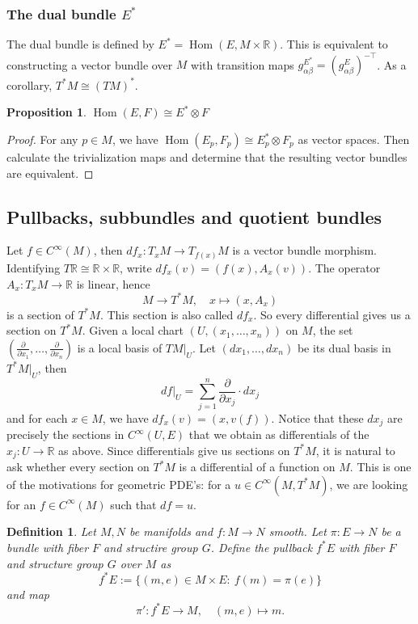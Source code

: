 \documentclass[10pt, a4paper]{article}
\newtheorem{proposition}[thm]{Proposition}
\newtheorem{defi}[thm]{Definition}
\newenvironment{noticeB}{%
  \tcolorbox[%
  notitle,
  empty,
  enhanced,  %
  breakable,
  coltext=black,
  colback=white, 
  fontupper=\rmfamily,
  noparskip,
  sharp corners,
  boxrule=-1pt,  %
  frame hidden,
  left=7pt,  %
  right=7pt,
  top=5pt,
  bottom=5pt,
  before skip=2.5ex plus 2pt,
  after skip=2.5ex plus 2pt,
  borderline west = {1.5pt}{-0.1pt}{blue!30!black}, %
  overlay unbroken and last={%
    \draw[color=black, line width=1.25pt]
    ($(frame.south west)+(1.pt, -0.1pt)$) -- ++(2em, 0);
  }
  ]}
{\endtcolorbox}
\newenvironment{definition}{\begin{noticeB}\begin{defi}}{%
    \end{defi}\end{noticeB}}
\newenvironment{noticeC}{%
  \tcolorbox[%
  notitle,
  empty,
  enhanced,  %
  breakable,
  coltext=black, 
  fontupper=\rmfamily,
  noparskip,
  sharp corners,
  boxrule=-1pt,  %
  frame hidden,
  left=7pt,  %
  right=7pt,
  top=5pt,
  bottom=5pt,
  before skip=2.5ex plus 2pt,
  after skip=2.5ex plus 2pt,
  overlay unbroken and last={%
  },
  ]}
{\endtcolorbox}
\newenvironment{myproof}%
  {\begin{noticeC}\begin{proof}}%
  {\end{proof}\end{noticeC}}
\newcommand{\R}{\mathbb {R}}
\DeclareMathOperator{\ho}{Hom}
\begin{document}
\subsubsection*{The dual bundle $E^*$}

The dual bundle is defined by $E^* = \ho (E, M \times \R)$.
This is equivalent to constructing a vector bundle over $M$ with 
transition maps $g_{\alpha \beta} ^{E^*} = (g_{\alpha \beta} ^E)^{-\top}$.
As a corollary, $T^* M \cong (TM)^*$.

\begin{proposition}
  $\ho (E, F) \cong E^* \otimes F$
\end{proposition}

\begin{myproof}
  For any $p \in M$, we have $\ho (E_p, F_p) \cong E^* _p \otimes F_p$ as vector spaces.
  Then calculate the trivialization maps and determine that the resulting vector bundles are equivalent.
\end{myproof}

\subsection{Pullbacks, subbundles and quotient bundles}

Let $f \in C^\infty (M)$, then $df_x : T_x M \to T_{f(x)} M$
is a vector bundle morphism. Identifying $T \R \cong \R \times \R$,
write $df_x (v) = (f(x), A_x (v))$. The operator $A_x : T_x M \to \R$
is linear, hence 
$$M \to T^* M,\quad x \mapsto (x, A_x)$$ 
is a section of $T^* M$. This section is also called $df_x$.
So every differential gives us a section on $T^* M$.
Given a local chart $(U, (x_1, \dots, x_n))$ on $M$, the set 
$\left(\frac{\partial}{\partial x_1}, \dots, \frac{\partial}{\partial x_n}\right)$
is a local basis of $TM \big|_U$. Let 
$(d x_1, \dots, d x_n)$ be its dual basis in $T^* M\big|_U$, then 
$$df\big|_U = \sum_{j = 1} ^n \frac{\partial}{\partial x_j} \cdot dx_j$$
and for each $x \in M$, we have $df_x (v) = (x, v(f))$.
Notice that these $dx_j$ are precisely the sections in $C^\infty (U, E)$
that we obtain as differentials of the $x_j: U \to \R$ as above.
Since differentials give us sections on $T^* M$, it is natural to ask whether 
every section on $T^* M$ is a differential of a function on $M$. 
This is one of the motivations for geometric PDE's: for a $u \in C^\infty (M, T^* M)$,
we are looking for an $f \in C^\infty (M)$ such that $df = u$.

\begin{definition}
  Let $M, N$ be manifolds and $f: M \to N$ smooth. Let $\pi: E \to N$
  be a bundle with fiber $F$ and structire group $G$.
  Define the pullback $f^* E$ with fiber $F$ and structure group $G$ over $M$ as 
  $$f^* E := \{(m, e) \in M \times E:\ f(m) = \pi (e)\}$$
  and map 
  $$\pi': f^* E \to M,\quad (m, e) \mapsto m.$$
\end{definition}
\end{document}
